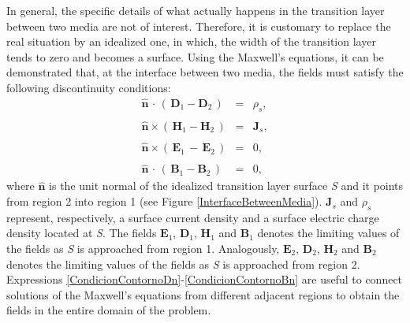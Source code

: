 In general, the specific details of what actually happens in the transition layer between two media are not of interest. Therefore, it is customary to replace the real situation by an idealized one, in which, the width of the transition layer tends to zero and becomes a surface. Using the Maxwell's equations, it can be demonstrated that, at the interface between two media, the fields must satisfy the following discontinuity conditions:
\begin{eqnarray}
    \mathbf{\hat{n}}\,\cdot\,\left(\,\mathbf{D}_{1} - \mathbf{D}_{2}\,\right) &=& \rho_{s}, 
    \label{CondicionContornoDn}
	\\\nonumber
	\\[-1em]
	\mathbf{\hat{n}}\times\left(\,\mathbf{H}_{1} - \mathbf{H}_{2}\,\right) &=& \mathbf{J}_{s}, \label{CondicionContornoHt}
	\\\nonumber
	\\[-1em]
	\mathbf{\hat{n}}\times\left(\,\mathbf{E}_{1}\,-\,\mathbf{E}_{2}\,\right) &=& 0, 
	\label{CondicionContornoEt}
	\\\nonumber
	\\[-1em]
	\mathbf{\hat{n}}\,\cdot\,\left(\,\mathbf{B}_{1} - \mathbf{B}_{2}\,\right) &=& 0, 
	\label{CondicionContornoBn}
\end{eqnarray}
where $\mathbf{\hat{n}}$ is the unit normal of the idealized transition layer surface \emph{S} and it points from region 2 into region 1 (see Figure \ref{InterfaceBetweenMedia}). $\mathbf{J}_{s}$ and $\rho_{s}$ represent, respectively, a surface current density and a surface electric charge density located at \emph{S}. The fields $\mathbf{E}_{1}$, $\mathbf{D}_{1}$, $\mathbf{H}_{1}$ and $\mathbf{B}_{1}$ denotes the limiting values of the fields as \emph{S} is approached from region 1. Analogously, $\mathbf{E}_{2}$, $\mathbf{D}_{2}$, $\mathbf{H}_{2}$ and $\mathbf{B}_{2}$ denotes the limiting values of the fields as \emph{S} is approached from region 2. Expressions \eqref{CondicionContornoDn}-\eqref{CondicionContornoBn} are useful to connect solutions of the Maxwell's equations from different adjacent regions to obtain the fields in the entire domain of the problem.

